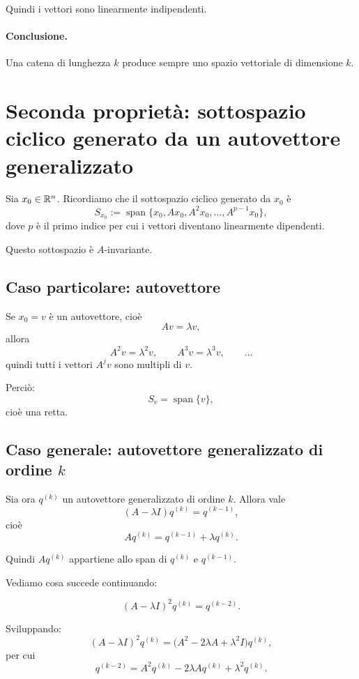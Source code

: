 Quindi i vettori sono linearmente indipendenti.

\paragraph{Conclusione.}
Una catena di lunghezza $k$ produce sempre uno spazio vettoriale di dimensione $k$.

\section{Seconda proprietà: sottospazio ciclico generato da un autovettore generalizzato}

Sia $x_0 \in \mathbb{R}^n$. Ricordiamo che il sottospazio ciclico generato da $x_0$ è
\begin{equation}
S_{x_0} := \operatorname{span}\{x_0, Ax_0, A^2x_0, \dots, A^{p-1}x_0\},
\label{eq:L8_cyclic_subspace}
\end{equation}
dove $p$ è il primo indice per cui i vettori diventano linearmente dipendenti.

Questo sottospazio è $A$-invariante.

\subsection{Caso particolare: autovettore}

Se $x_0 = v$ è un autovettore, cioè
\[
Av = \lambda v,
\]
allora
\[
A^2v = \lambda^2 v,\qquad A^3v = \lambda^3 v,\qquad \dots
\]
quindi tutti i vettori $A^j v$ sono multipli di $v$.

Perciò:
\[
S_v = \operatorname{span}\{v\},
\]
cioè una retta.

\subsection{Caso generale: autovettore generalizzato di ordine \texorpdfstring{$k$}{k}}

Sia ora $q^{(k)}$ un autovettore generalizzato di ordine $k$.  
Allora vale
\[
(A-\lambda I)q^{(k)} = q^{(k-1)},
\]
cioè
\[
Aq^{(k)} = q^{(k-1)} + \lambda q^{(k)}.
\]

Quindi $Aq^{(k)}$ appartiene allo span di $q^{(k)}$ e $q^{(k-1)}$.

Vediamo cosa succede continuando:

\[
(A-\lambda I)^2 q^{(k)} = q^{(k-2)}.
\]

Sviluppando:
\[
(A-\lambda I)^2 q^{(k)} = \bigl(A^2 - 2\lambda A + \lambda^2 I \bigr)q^{(k)},
\]
per cui
\[
q^{(k-2)} = A^2 q^{(k)} - 2\lambda A q^{(k)} + \lambda^2 q^{(k)}.
\]

